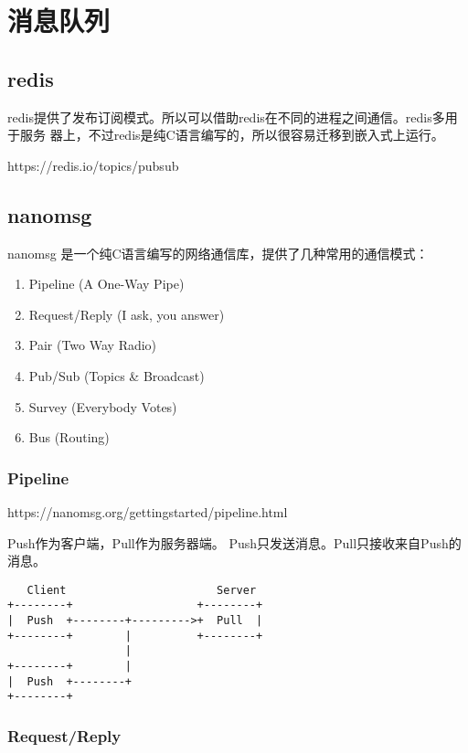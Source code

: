 \chapter{消息队列}

\section{redis}

redis提供了发布订阅模式。所以可以借助redis在不同的进程之间通信。redis多用于服务
器上，不过redis是纯C语言编写的，所以很容易迁移到嵌入式上运行。

https://redis.io/topics/pubsub

\section{nanomsg}

nanomsg 是一个纯C语言编写的网络通信库，提供了几种常用的通信模式：

\begin{enumerate}
  \item Pipeline (A One-Way Pipe)
  \item Request/Reply (I ask, you answer)
  \item Pair (Two Way Radio)
  \item Pub/Sub (Topics \& Broadcast)
  \item Survey (Everybody Votes)
  \item Bus (Routing)
\end{enumerate}

\subsection{Pipeline}

https://nanomsg.org/gettingstarted/pipeline.html

Push作为客户端，Pull作为服务器端。
Push只发送消息。Pull只接收来自Push的消息。

\begin{verbatim}
   Client                       Server
+--------+                   +--------+
|  Push  +--------+--------->+  Pull  |
+--------+        |          +--------+
                  |
+--------+        |
|  Push  +--------+
+--------+
\end{verbatim}

\subsection{Request/Reply}

